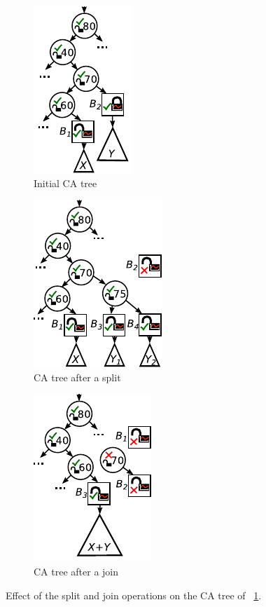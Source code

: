 \documentclass[a4paper,UKenglish]{oasics-v2016}
\begin{document}
\begin{figure}[t]
  \newcommand{\graphheight}{.17\textheight}
  \newcommand{\bsp}{\hspace*{20pt}}
  \centering
  \begin{subfigure}[t]{3.2cm}
    \centering
    \includegraphics[height=\graphheight]{catree_split_join/inital_state}
    \caption{Initial CA tree}\label{fig:initial}
  \end{subfigure}\bsp
  \begin{subfigure}[t]{3.5cm}
    \centering
    \includegraphics[height=\graphheight]{catree_split_join/state2b_split}
    \caption{CA tree after a split}\label{fig:split}
  \end{subfigure}\bsp
  \begin{subfigure}[t]{3.5cm}
    \centering
    \includegraphics[height=\graphheight]{catree_split_join/state2a_join}
    \caption{CA tree after a join}\label{fig:join}
  \end{subfigure}
  \caption{Effect of the split and join operations on the CA tree of \figurename~\ref{fig:initial}.}
  \label{fig:split+join}
\end{figure}
\end{document}
